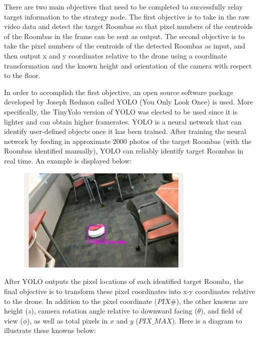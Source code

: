 \documentclass[12pt,letterpaper]{article}
\begin{document}
			There are two main objectives that need to be completed to successfully relay target information to the strategy node. The first objective is to take in the raw video data and detect the target Roombas so that pixel numbers of the centroids of the Roombas in the frame can be sent as output. The second objective is to take the pixel numbers of the centroids of the detected Roombas as input, and then output x and y coordinates relative to the drone using a coordinate transformation and the known height and orientation of the camera with respect to the floor.

			In order to accomplish the first objective, an open source software package developed by Joseph Redmon called YOLO (You Only Look Once) is used. More specifically, the TinyYolo version of YOLO was elected to be used since it is lighter and can obtain higher framerates. YOLO is a neural network that can identify user-defined objects once it has been trained. After training the neural network by feeding in approximate 2000 photos of the target Roombas (with the Roombas identified manually), YOLO can reliably identify target Roombas in real time. An example is displayed below:

			\begin{figure}[!htbp]
				\begin{center}
					\includegraphics[width=0.75\textwidth]{roomba}
				\end{center}
			\end{figure}

			After YOLO outputs the pixel locations of each identified target Roomba, the final objective is to transform these pixel coordinates into x-y coordinates relative to the drone. In addition to the pixel coordinate ($PIX \#$), the other knowns are height ($z$), camera rotation angle relative to downward facing ($\theta$), and field of view ($\phi$), as well as total pixels in $x$ and $y$ ($PIX\_MAX$). Here is a diagram to illustrate these knowns below:
\end{document}
